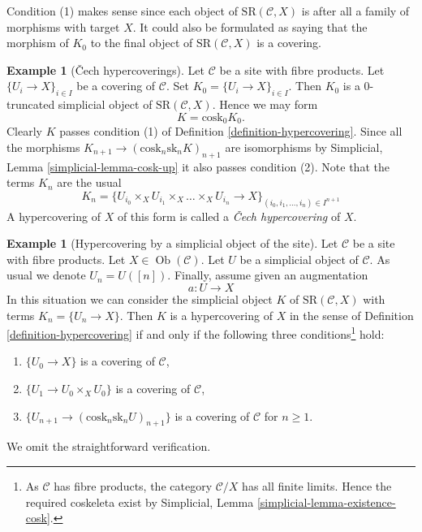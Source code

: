 \documentclass{stacks-project}
\theoremstyle{plain}
\theoremstyle{definition}
\newtheorem{example}[subsection]{Example}
\theoremstyle{remark}
\numberwithin{equation}{subsection}
\def\Ob{\mathop{\mathrm{Ob}}\nolimits}
\begin{document}
\noindent
Condition (1) makes sense since each object of
$\text{SR}(\mathcal{C}, X)$ is after all a family
of morphisms with target $X$. It could also be
formulated as saying that the morphism of $K_0$ to
the final object of $\text{SR}(\mathcal{C}, X)$
is a covering.

\begin{example}[{\v C}ech hypercoverings]
\label{example-cech}
Let $\mathcal{C}$ be a site with fibre products.
Let $\{U_i \to X\}_{i \in I}$ be a covering of $\mathcal{C}$.
Set $K_0 = \{U_i \to X\}_{i \in I}$.
Then $K_0$ is a $0$-truncated simplicial object of
$\text{SR}(\mathcal{C}, X)$. Hence we may form
$$
K = \text{cosk}_0 K_0.
$$
Clearly $K$ passes condition (1) of Definition \ref{definition-hypercovering}.
Since all the morphisms $K_{n + 1} \to (\text{cosk}_n \text{sk}_n K)_{n + 1}$
are isomorphisms by
Simplicial, Lemma \ref{simplicial-lemma-cosk-up}
it also passes condition (2). Note that
the terms $K_n$ are the usual
$$
K_n = \{
U_{i_0} \times_X U_{i_1} \times_X \ldots \times_X U_{i_n} \to X
\}_{(i_0, i_1, \ldots, i_n) \in I^{n + 1}}
$$
A hypercovering of $X$ of this form is called a
{\it {\v C}ech hypercovering} of $X$.
\end{example}

\begin{example}[Hypercovering by a simplicial object of the site]
\label{example-hypercovering-in-C}
Let $\mathcal{C}$ be a site with fibre products. Let
$X \in \Ob(\mathcal{C})$. Let $U$ be a simplicial object of $\mathcal{C}$.
As usual we denote $U_n = U([n])$. Finally, assume given an augmentation
$$
a : U \to X
$$
In this situation we can consider the simplicial object $K$
of $\text{SR}(\mathcal{C}, X)$ with terms $K_n = \{U_n \to X\}$.
Then $K$ is a hypercovering of $X$ in the sense of
Definition \ref{definition-hypercovering}
if and only if the following three
conditions\footnote{As $\mathcal{C}$ has fibre products, the
category $\mathcal{C}/X$ has all finite limits.
Hence the required coskeleta exist by
Simplicial, Lemma \ref{simplicial-lemma-existence-cosk}.} hold:
\begin{enumerate}
\item $\{U_0 \to X\}$ is a covering of $\mathcal{C}$,
\item $\{U_1 \to U_0 \times_X U_0\}$ is a covering of $\mathcal{C}$,
\item $\{U_{n + 1} \to (\text{cosk}_n\text{sk}_n U)_{n + 1}\}$
is a covering of $\mathcal{C}$ for $n \geq 1$.
\end{enumerate}
We omit the straightforward verification.
\end{example}
\end{document}
